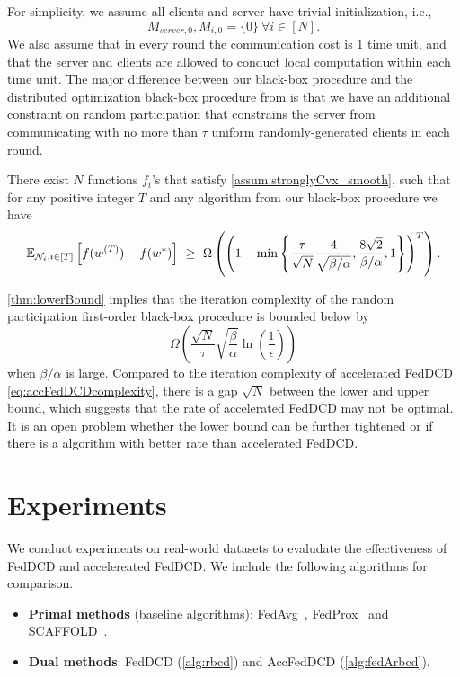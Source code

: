 For simplicity, we assume all clients and server have trivial initialization, i.e.,
\[M_{server, 0}, M_{i,0} = \{0\}~\forall i \in [N].\] 
We also assume that in every round the communication cost is 1 time unit, and that the server and clients are allowed to conduct local computation within each time unit. The major difference between our black-box procedure and the distributed optimization black-box procedure from \citet{Scaman2017OptimalAF} is that we have an additional constraint on random participation that constrains the server from communicating with no more than $\tau$ uniform randomly-generated clients in each round.

\begin{theorem} \label{thm:lowerBound}
    There exist $N$ functions $f_i$'s that satisfy \autoref{assum:stronglyCvx_smooth}, such that for any positive integer $T$ and any algorithm from our black-box procedure we have
    \[\mathbb{E}_{ \mathcal{N}_i, i \in [T] } \left[ f( w^{(T)} ) - f(w^*) \right]  ~\geq~ \Omega \left( \left( 1 - \min\left\{ \frac{\tau}{\sqrt{N}} \frac{4}{ \sqrt{ \beta/\alpha }}, \frac{8 \sqrt{2} }{\beta/\alpha} , 1\right\} \right)^T \right).\]
\end{theorem}

\autoref{thm:lowerBound} implies that the iteration complexity of the random participation first-order black-box procedure is bounded below by
\[
    \Omega \left( \frac{\sqrt{N}}{\tau} \sqrt{ \frac{\beta}{\alpha} } \ln\left( \frac{1}{\epsilon} \right) \right)
\]
when $\beta/\alpha$ is large. Compared to the iteration complexity of accelerated FedDCD \eqref{eq:accFedDCDcomplexity}, there is a gap $\sqrt{N}$ between the lower and upper bound, which suggests that the rate of accelerated FedDCD may not be optimal. It is an open problem whether the lower bound can be further tightened or if there is a algorithm with better rate than accelerated FedDCD.


\section{Experiments}
\label{sec:experiments}

We conduct experiments on real-world datasets to evaludate the effectiveness of FedDCD and accelereated FedDCD. We include the following algorithms for comparison. 
\begin{itemize}
    \item \textbf{Primal methods} (baseline algorithms): FedAvg~\citep{mcmahan2017communication}, FedProx~\citep{li2018federated} and SCAFFOLD~\citep{pmlr-v119-karimireddy20a}. 
    \item \textbf{Dual methods}: FedDCD (\autoref{alg:rbcd}) and AccFedDCD (\autoref{alg:fedArbcd}).
\end{itemize}

